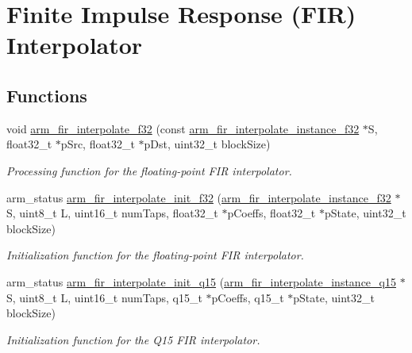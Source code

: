 \hypertarget{group___f_i_r___interpolate}{\section{Finite Impulse Response (F\-I\-R) Interpolator}
\label{group___f_i_r___interpolate}
}
\subsection*{Functions}
\begin{DoxyCompactItemize}
\item 
void \hyperlink{group___f_i_r___interpolate_ga9cae104c5cf60b4e7671c82264a8c12e}{arm\-\_\-fir\-\_\-interpolate\-\_\-f32} (const \hyperlink{structarm__fir__interpolate__instance__f32}{arm\-\_\-fir\-\_\-interpolate\-\_\-instance\-\_\-f32} $\ast$S, float32\-\_\-t $\ast$p\-Src, float32\-\_\-t $\ast$p\-Dst, uint32\-\_\-t block\-Size)
\begin{DoxyCompactList}\small\item\em Processing function for the floating-\/point F\-I\-R interpolator. \end{DoxyCompactList}\item 
arm\-\_\-status \hyperlink{group___f_i_r___interpolate_ga0f857457a815946f7e4dca989ebf6ff6}{arm\-\_\-fir\-\_\-interpolate\-\_\-init\-\_\-f32} (\hyperlink{structarm__fir__interpolate__instance__f32}{arm\-\_\-fir\-\_\-interpolate\-\_\-instance\-\_\-f32} $\ast$S, uint8\-\_\-t L, uint16\-\_\-t num\-Taps, float32\-\_\-t $\ast$p\-Coeffs, float32\-\_\-t $\ast$p\-State, uint32\-\_\-t block\-Size)
\begin{DoxyCompactList}\small\item\em Initialization function for the floating-\/point F\-I\-R interpolator. \end{DoxyCompactList}\item 
arm\-\_\-status \hyperlink{group___f_i_r___interpolate_ga18e8c4a74ff1d0f88876cc63f675288f}{arm\-\_\-fir\-\_\-interpolate\-\_\-init\-\_\-q15} (\hyperlink{structarm__fir__interpolate__instance__q15}{arm\-\_\-fir\-\_\-interpolate\-\_\-instance\-\_\-q15} $\ast$S, uint8\-\_\-t L, uint16\-\_\-t num\-Taps, q15\-\_\-t $\ast$p\-Coeffs, q15\-\_\-t $\ast$p\-State, uint32\-\_\-t block\-Size)
\begin{DoxyCompactList}\small\item\em Initialization function for the Q15 F\-I\-R interpolator. \end{DoxyCompactList}\item 

\end{DoxyCompactItemize}
